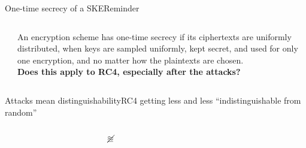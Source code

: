 \documentclass[aspectratio=169, lualatex, handout]{beamer}
\begin{document}
\begin{frame}{One-time secrecy of a SKE}{Reminder}
	\begin{columns}[c]
		\begin{column}{0.5\textwidth}
		\end{column}
		\begin{column}{0.5\textwidth}
			An encryption scheme has one-time secrecy if its ciphertexts are uniformly distributed, when keys are sampled uniformly, kept secret, and used for only one encryption, and no matter how the plaintexts are chosen.
			\\
			\textbf{Does this apply to RC4, especially after the attacks?}
		\end{column}
	\end{columns}
\end{frame}

\begin{frame}{Attacks mean distinguishability}{RC4 getting less and less ``indistinguishable from random''}
	\begin{columns}[c]
		\begin{column}{0.35\textwidth}
		\end{column}
		\begin{column}{0.3\textwidth}
			\begin{center}
				{\huge{$\cancel{\approxeq}$}} \\[1em]
			\end{center}
		\end{column}
		\begin{column}{0.35\textwidth}
		\end{column}
	\end{columns}
\end{frame}
\end{document}
